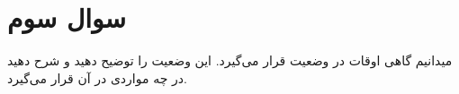 \section{سوال سوم}

میدانیم گاهی اوقات  در وضعیت  قرار می‌گیرد. این وضعیت را توضیح دهید و شرح دهید در چه مواردی  در آن قرار می‌گیرد.


\begin{qsolve}[]
	
\end{qsolve}